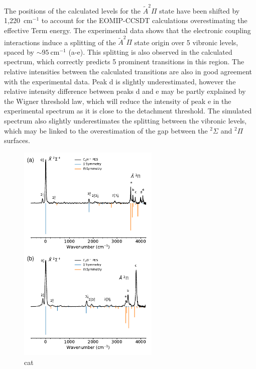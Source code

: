 \documentclass[journal=jpcafh,manuscript=article,layout=onecolumn, 12pt]{achemso}
\begin{document}
The positions of the calculated levels for the $\tilde{A}^2\Pi$ state have been shifted by 1,220~cm$^{-1}$ to account for the EOMIP-CCSDT calculations overestimating the effective Term energy. The experimental data shows that the electronic coupling interactions induce a splitting of the $\tilde{A} ^2\Pi$ state origin over 5 vibronic levels, spaced by $\sim 95~$cm$^{-1}$ (a-e). This splitting is also observed in the calculated spectrum, which correctly predicts 5 prominent transitions in this region. The relative intensities between the calculated transitions are also in good agreement with the experimental data. Peak d is slightly underestimated, however the relative intensity difference between peaks d and e may be partly explained by the Wigner threshold law, which will reduce the intensity of peak e in the experimental spectrum as it is close to the detachment threshold. The simulated spectrum also slightly underestimates the splitting between the vibronic levels, which may be linked to the overestimation of the gap between the $^2\Sigma$ and $^2\Pi$ surfaces.

\begin{figure}[th!]
	\includegraphics[width=0.6\textwidth]{figures/Fig5.pdf}
	\caption{cat}
	\label{fig:C2H-plot}
\end{figure}
\end{document}
